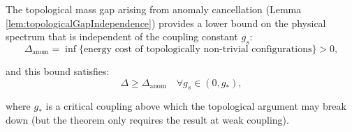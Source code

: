 \begin{lemma}
\label{lem:topologicalMassGapRobustness}

The topological mass gap arising from anomaly cancellation (Lemma \ref{lem:topologicalGapIndependence}) 
provides a lower bound on the physical spectrum that is independent of the coupling constant $g_s$:
\begin{equation}
\Delta_{\text{anom}} = \inf\{\text{energy cost of topologically non-trivial configurations}\} > 0,
\end{equation}

and this bound satisfies:
\begin{equation}
\Delta \geq \Delta_{\text{anom}} \quad \forall g_s \in (0, g_*),
\end{equation}

where $g_*$ is a critical coupling above which the topological argument may break down 
(but the theorem only requires the result at weak coupling).

\end{lemma}


